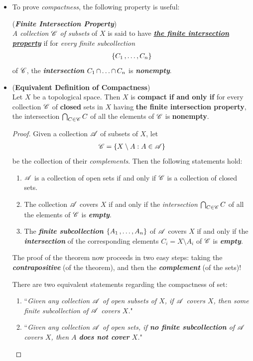 \documentclass[11pt]{article}
\begin{document}
\begin{itemize}
\item To prove \emph{compactness}, the following property is useful:
\begin{definition} (\emph{\textbf{Finite Intersection Property}})\\
\emph{A collection ${\mathscr C}$ of subsets} of $X$ is said to have \underline{\emph{\textbf{the finite intersection property}}} if for \emph{every finite subcollection}
\begin{align*}
\{C_1 \,{,}\ldots{,}\, C_n\}
\end{align*}
 of ${\mathscr C}$, the \emph{\textbf{intersection}} $C_1 \,{\cap}\ldots{\cap}\, C_n$ is \emph{\textbf{nonempty}}.
\end{definition}

\item \begin{proposition} (\textbf{Equivalent Definition of Compactness}) \citep{munkres2000topology} \\
Let $X$ be a topological space. Then $X$ is \textbf{compact} \textbf{if and only if} for every collection ${\mathscr C}$ of \textbf{closed} sets in $X$ having \textbf{the finite intersection property}, the intersection $\bigcap_{C\in {\mathscr C}}C$ of all the elements of ${\mathscr C}$ is \textbf{nonempty}.
\end{proposition}
\begin{proof}
Given a collection ${\mathscr A}$ of subsets of $X$, let
\begin{align*}
{\mathscr C} = \left\{X \setminus A:  A \in {\mathscr A}\right\}
\end{align*}
be the collection of their \emph{complements}. Then the following statements hold:
\begin{enumerate}
\item ${\mathscr A}$ is a collection of open sets if and only if ${\mathscr C}$ is a collection of closed sets.
\item The collection ${\mathscr A}$ covers $X$ if and only if the \emph{intersection} $\bigcap_{C \in {\mathscr C}} C$ of all the elements of ${\mathscr C}$ is \emph{\textbf{empty}}.
\item The \emph{\textbf{finite subcollection}} $\{A_1 \,{,}\ldots{,}\, A_n\}$ of ${\mathscr A}$ covers $X$ if and only if the \emph{\textbf{intersection}} of the corresponding elements $C_i = X \setminus A_i$ of ${\mathscr C}$ is \emph{\textbf{empty}}.
\end{enumerate}
The proof of the theorem now proceeds in two easy steps: taking the \emph{\textbf{contrapositive}} (of the theorem), and then the \emph{\textbf{complement}} (of the sets)!

There are two equivalent statements regarding the compactness of set:
\begin{enumerate}
\item ``\emph{Given any collection ${\mathscr A}$ of open subsets of $X$, if ${\mathscr A}$ covers $X$, then some finite subcollection of ${\mathscr A}$ covers $X$.}"
\item ``\emph{Given any collection ${\mathscr A}$ of open sets, if \textbf{no finite subcollection} of ${\mathscr A}$ covers $X$, then $A$ \textbf{does not cover} $X$.}"


\end{enumerate}
\end{proof}
\end{itemize}
\end{document}
